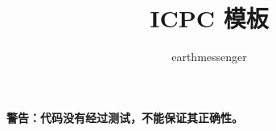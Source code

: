 \documentclass{article}
\title{ICPC 模板}
\author{earthmessenger}
\begin{document}
\maketitle

\clearpage

\textbf{警告：代码没有经过测试，不能保证其正确性。}

\tableofcontents




\end{document}
